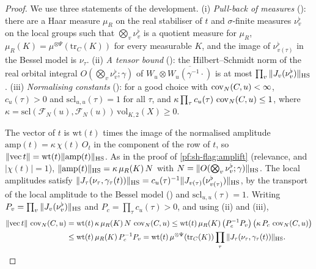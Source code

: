 \begin{proof}
We use three statements of the development. (i) \emph{Pull-back of measures}
(): there are a Haar measure $\mu_R$ on the real stabiliser of $t$ and
$\sigma$-finite measures $\nu^\flat_v$ on the local groups such that $\bigotimes_v\nu^\flat_v$ is a quotient measure for $\mu_R$,
$\mu_R(K)=\mu^{\otimes\Psi}(\mathrm{tr}_C(K))$ for every measurable $K$, and the image of $\nu^\flat_{v(\tau)}$ in the Bessel model is $\nu_\tau$.
(ii) \emph{A tensor bound} (): the Hilbert--Schmidt norm of the real
orbital integral $O(\bigotimes_v\nu^\flat_v;\gamma)$ of $W_u\otimes\overline{W_u(\gamma^{-1}\cdot)}$ is at most $\prod_v\|J_v(\nu^\flat_v)\|_{\mathrm{HS}}$.
(iii) \emph{Normalising constants} (): for a good choice with
$\operatorname{cov}_N(C,u)<\infty$, $c_u(\tau)>0$ and $\mathrm{scl}_{u,u}(\tau)=1$ for all $\tau$, and $\kappa\prod_\tau c_u(\tau)\,\operatorname{cov}_N(C,u)\le1$,
where $\kappa=\mathrm{scl}(\mathcal F_N(u),\mathcal F_N(u))\,\mathrm{vol}_{K,2}(X)\ge0$.

The vector of $t$ is $\mathrm{wt}(t)$ times the image of the normalised amplitude $\mathrm{amp}(t)=\kappa\,\chi(t)\,O_t$ in the
component of the row of $t$, so $\|\mathrm{vec}\,t\|=\mathrm{wt}(t)\|\mathrm{amp}(t)\|_{\mathrm{HS}}$. As in the proof of \cref{pf:sh-flag:amplift}
(relevance,  and $|\chi(t)|=1$),
$\|\mathrm{amp}(t)\|_{\mathrm{HS}}=\kappa\,\mu_R(K)\,N$ with $N=\|O(\bigotimes_v\nu^\flat_v;\gamma)\|_{\mathrm{HS}}$. The local amplitudes satisfy
$\|J_\tau(\nu_\tau,\gamma_\tau(t))\|_{\mathrm{HS}}=c_u(\tau)^{-1}\|J_{v(\tau)}(\nu^\flat_{v(\tau)})\|_{\mathrm{HS}}$, by the transport of the local amplitude to
the Bessel model () and $\mathrm{scl}_{u,u}(\tau)=1$. Writing $P_v=\prod_v\|J_v(\nu^\flat_v)\|_{\mathrm{HS}}$
and $P_c=\prod_\tau c_u(\tau)>0$, and using (ii) and (iii),
\begin{align*}
\|\mathrm{vec}\,t\|\,\operatorname{cov}_N(C,u)&=\mathrm{wt}(t)\,\kappa\,\mu_R(K)\,N\,\operatorname{cov}_N(C,u)
\le\mathrm{wt}(t)\,\mu_R(K)\,\bigl(P_c^{-1}P_v\bigr)\,\bigl(\kappa\,P_c\,\operatorname{cov}_N(C,u)\bigr)\\
&\le\mathrm{wt}(t)\,\mu_R(K)\,P_c^{-1}P_v=\mathrm{wt}(t)\,\mu^{\otimes\Psi}(\mathrm{tr}_C(K))\prod_\tau\|J_\tau(\nu_\tau,\gamma_\tau(t))\|_{\mathrm{HS}}.\qedhere
\end{align*}
\end{proof}

